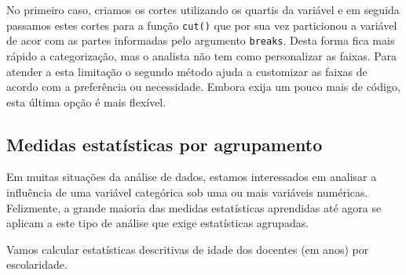 \documentclass[11pt,]{style/krantz}
\theoremstyle{definition}
\theoremstyle{definition}
\theoremstyle{definition}
\theoremstyle{remark}
\let\BeginKnitrBlock\begin \let\EndKnitrBlock\end
\begin{document}
No primeiro caso, criamos os cortes utilizando os quartis da variável e em seguida passamos estes cortes para a função \texttt{cut()} que por sua vez particionou a variável de acor com as partes informadas pelo argumento \texttt{breaks}. Desta forma fica mais rápido a categorização, mas o analista não tem como personalizar as faixas. Para atender a esta limitação o segundo método ajuda a customizar as faixas de acordo com a preferência ou necessidade. Embora exija um pouco mais de código, esta última opção é mais flexível.

\hypertarget{medidas-estatisticas-por-agrupamento}{%
\subsection{Medidas estatísticas por agrupamento}\label{medidas-estatisticas-por-agrupamento}}

Em muitas situações da análise de dados, estamos interessados em analisar a influência de uma variável categórica sob uma ou mais variáveis numéricas. Felizmente, a grande maioria das medidas estatísticas aprendidas até agora se aplicam a este tipo de análise que exige estatísticas agrupadas.

\BeginKnitrBlock{example}
\protect\hypertarget{exm:unnamed-chunk-81}{}{\label{exm:unnamed-chunk-81} }Vamos calcular estatísticas descritivas de idade dos docentes (em anos) por escolaridade.
\EndKnitrBlock{example}
\end{document}
